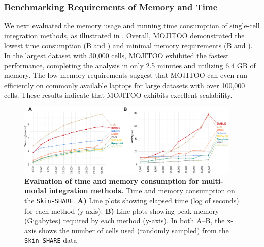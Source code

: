 \subsubsection{Benchmarking Requirements of Memory and Time}
We next evaluated the memory usage and running time consumption of single-cell integration methods, as illustrated in . Overall, MOJITOO demonstrated the lowest time consumption (B and ) and minimal memory requirements (B and ). In the largest dataset with 30,000 cells, MOJITOO exhibited the fastest performance, completing the analysis in only 2.5 minutes and utilizing 6.4 GB of memory. The low memory requirements suggest that MOJITOO can even run efficiently on commonly available laptops for large datasets with over 100,000 cells. These results indicate that MOJITOO exhibits excellent scalability.
\begin{figure}[!ht]
	\centering
	\includegraphics[width=0.95\textwidth]{time_memory/fig}
	\vspace{0.1cm}
	\caption[Evaluation of time and memory consumption for multi-modal integration methods.]{\textbf{Evaluation of time and memory consumption for multi-modal integration methods.} Time and memory consumption on the \texttt{Skin-SHARE}. \textbf{A)} Line plots showing elapsed time (log of seconds) for each method (y-axis). \textbf{B)} Line plots showing peak memory (Gigabytes) required by each method (y-axis). In both A–B, the x-axis shows the number of cells used (randomly sampled) from the \texttt{Skin-SHARE} data}
	\label{fig:time_memory}
\end{figure}



